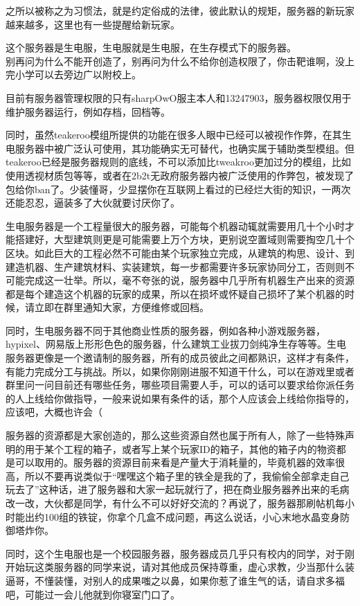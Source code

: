 \documentclass[
]{article}
\begin{document}
之所以被称之为习惯法，就是约定俗成的法律，彼此默认的规矩，服务器的新玩家越来越多，这里也有一些提醒给新玩家。

这个服务器是生电服，生电服就是生电服，在生存模式下的服务器。\\
别再问为什么不能开创造了，别再问为什么不给你创造权限了，你击靶谁啊，没上完小学可以去旁边广以附校上。

目前有服务器管理权限的只有sharpOwO服主本人和13247903，服务器权限仅用于维护服务器运行，例如存档，回档等。

同时，虽然teakeroo模组所提供的功能在很多人眼中已经可以被视作作弊，在其生电服务器中被广泛认可使用，其功能确实无可替代，也确实属于辅助类型模组。但teakeroo已经是服务器规则的底线，不可以添加比tweakroo更加过分的模组，比如使用透视材质包等等，或者在2b2t无政府服务器内被广泛使用的作弊包，被发现了包给你ban了。少装懂哥，少显摆你在互联网上看过的已经烂大街的知识，一两次还能忍忍，逼装多了大伙就要讨厌你了。

生电服务器是一个工程量很大的服务器，可能每个机器动辄就需要用几十个小时才能搭建好，大型建筑则更是可能需要上万个方块，更别说空置域则需要掏空几十个区块。如此巨大的工程必然不可能由某个玩家独立完成，从建筑的构思、设计、到建造机器、生产建筑材料、实装建筑，每一步都需要许多玩家协同分工，否则则不可能完成这一壮举。所以，毫不夸张的说，服务器中几乎所有机器生产出来的资源都是每个建造这个机器的玩家的成果，所以在损坏或怀疑自己损坏了某个机器的时候，请立即在群里通知大家，方便维修或回档。

同时，生电服务器不同于其他商业性质的服务器，例如各种小游戏服务器，hypixel、网易版上形形色色的服务器，什么建筑工业拔刀剑纯净生存等等。生电服务器更像是一个邀请制的服务器，所有的成员彼此之间都熟识，这样才有条件，有能力完成分工与挑战。所以，如果你刚刚进服不知道干什么，可以在游戏里或者群里问一问目前还有哪些任务，哪些项目需要人手，可以的话可以要求给你派任务的人上线给你做指导，一般来说如果有条件的话，那个人应该会上线给你指导的，应该吧，大概也许会（

服务器的资源都是大家创造的，那么这些资源自然也属于所有人，除了一些特殊声明的用于某个工程的箱子，或者写上某个玩家ID的箱子，其他的箱子内的物资都是可以取用的。服务器的资源目前来看是产量大于消耗量的，毕竟机器的效率很高，所以不要再说类似于``嘿嘿这个箱子里的铁全是我的了，我偷偷全部拿走自己玩去了''这种话，进了服务器和大家一起玩就行了，把在商业服务器养出来的毛病改一改，大伙都是同学，有什么不可以好好交流的？再说了，服务器那刷帖机每小时能出约100组的铁锭，你拿个几盒不成问题，再这么说话，小心末地水晶变身防御塔炸你。

同时，这个生电服也是一个校园服务器，服务器成员几乎只有校内的同学，对于刚开始玩这类服务器的同学来说，请对其他成员保持尊重，虚心求教，少当那什么装逼哥，不懂装懂，对别人的成果嗤之以鼻，如果你惹了谁生气的话，请自求多福吧，可能过一会儿他就到你寝室门口了。
\end{document}
